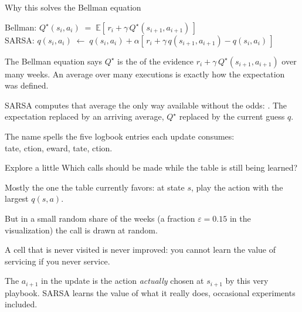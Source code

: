 \begin{frame}{Why this solves the Bellman equation}
\begin{center}
Bellman: \quad $Q^\star(s_i, a_i) \;=\; \mathbb{E}\left[\, r_i + \gamma\, Q^\star(s_{i+1}, a_{i+1}) \,\right]$
\\[3mm]
\pause
SARSA: \quad $q(s_i, a_i) \;\leftarrow\; q(s_i, a_i) + \alpha \left[\, r_i + \gamma\, q(s_{i+1}, a_{i+1}) - q(s_i, a_i) \,\right]$
\end{center}
\vspace{2mm}
\pause
\begin{bullets}
\item The Bellman equation says $Q^\star$ is the  of the evidence $r_i + \gamma\, Q^\star(s_{i+1}, a_{i+1})$ over many weeks. An average over many executions is exactly how the expectation was defined.
\item SARSA computes that average the only way available without the odds: . The expectation replaced by an arriving average, $Q^\star$ replaced by the current guess $q$.
\pause
\item The name spells the five logbook entries each update consumes:\\ tate, ction, eward, tate, ction.
\end{bullets}
\end{frame}

\begin{frame}{Explore a little}
Which calls should be made while the table is still being learned?
\begin{bullets}
\item Mostly the one the table currently favors: at state $s$, play the action with the largest $q(s,a)$.
\pause
\item But in a small random share of the weeks (a fraction $\varepsilon = 0.15$ in the visualization) the call is drawn at random.
\end{bullets}
\pause
\begin{alertbox}
A cell that is never visited is never improved: you cannot learn the value of servicing if you never service.
\end{alertbox}
\pause
\begin{bullets}
\item The $a_{i+1}$ in the update is the action \emph{actually} chosen at $s_{i+1}$ by this very playbook. SARSA learns the value of what it really does, occasional experiments included.
\end{bullets}
\end{frame}

